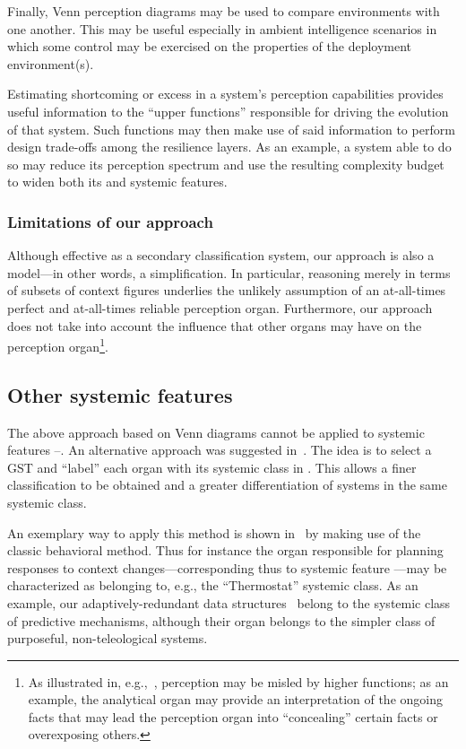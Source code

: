 \documentclass[twocolumn]{svjour3}
\def\A{\hbox{}}
\def\P{\hbox{}}
\def\K{\hbox{}}
\begin{document}
Finally, Venn perception diagrams may be used to compare environments with one another. This may be
useful especially in ambient intelligence scenarios in which some control may be exercised on
the properties of the deployment environment(s).

Estimating shortcoming or excess in a system's perception capabilities provides useful
information to the ``upper functions'' responsible for driving the evolution of that system. Such functions
may then make use of said information to perform design trade-offs among the resilience layers.
As an example,
a system able to do so may reduce its perception spectrum and use the resulting complexity budget to widen both
its \A{} and \P{} systemic features.

\subsubsection{Limitations of our approach}
Although effective as a secondary classification system, our
approach is also a model---in other words,
a simplification. In particular, reasoning merely in terms of subsets of context figures
underlies the unlikely assumption of an at-all-times perfect and at-all-times reliable
perception organ.
Furthermore, our approach does not take
into account the influence that other organs may have on the perception organ\footnote{As
	illustrated in, e.g.,~\cite{BrGr15}, 
	perception may be misled by higher functions; as an example, the analytical organ
	may provide an interpretation of the ongoing facts that may lead the perception
	organ into ``concealing'' certain facts or overexposing others.}.

\subsection{Other systemic features}\label{s:osf}
The above approach based on Venn diagrams cannot be applied to systemic features \A--\K.
An alternative approach was suggested in~\cite{DF13b}. The idea is to select
a GST  and
``label'' each organ with its systemic class in .
This allows a finer classification to be obtained and a greater differentiation
of systems in the same systemic class.

An exemplary way to apply this method
is shown in~\cite{DF14b} by making use of the classic behavioral method. Thus for instance
the organ responsible for planning responses to context changes---corresponding thus
to systemic feature \P---may be characterized as belonging to, e.g., the ``Thermostat'' systemic class.
As an example, our adaptively-redundant data structures~\cite{DF13a} belong to
the systemic class of predictive mechanisms, although their \P{} organ belongs
to the simpler class of purposeful, non-teleological systems.
\end{document}
